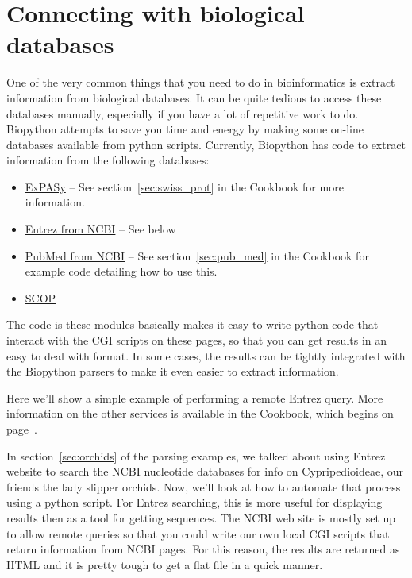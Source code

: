 \documentclass{report}
\begin{document}
\section{Connecting with biological databases}
\label{sec:connecting-with-biological-databases}

One of the very common things that you need to do in bioinformatics is extract information from biological databases. It can be quite tedious to access these databases manually, especially if you have a lot of repetitive work to do. Biopython attempts to save you time and energy by making some on-line databases available from python scripts. Currently, Biopython has code to extract information from the following databases:

\begin{itemize}
  \item \href{http://www.expasy.org/}{ExPASy} -- See section~\ref{sec:swiss_prot} in the Cookbook for more information.
  \item \href{http://www.ncbi.nlm.nih.gov/Entrez/}{Entrez from NCBI} -- See below
  \item \href{http://www.ncbi.nlm.nih.gov/PubMed/}{PubMed from NCBI} -- See section~\ref{sec:pub_med} in the Cookbook for example code detailing how to use this.
  \item \href{http://scop.mrc-lmb.cam.ac.uk/scop/}{SCOP}
\end{itemize}

The code is these modules basically makes it easy to write python code that interact with the CGI scripts on these pages, so that you can get results in an easy to deal with format. In some cases, the results can be tightly integrated with the Biopython parsers to make it even easier to extract information.


Here we'll show a simple example of performing a remote Entrez query. More information on the other services is available in the Cookbook, which begins on page~\pageref{sec:cookbook}.


In section~\ref{sec:orchids} of the parsing examples, we talked about using Entrez website to search the NCBI nucleotide databases for info on Cypripedioideae, our friends the lady slipper orchids. Now, we'll look at how to automate that process using a python script. For Entrez searching, this is more useful for displaying results then as a tool for getting sequences. The NCBI web site is mostly set up to allow remote queries so that you could write our own local CGI scripts that return information from NCBI pages. For this reason, the results are returned as HTML and it is pretty tough to get a flat file in a quick manner.
\end{document}
